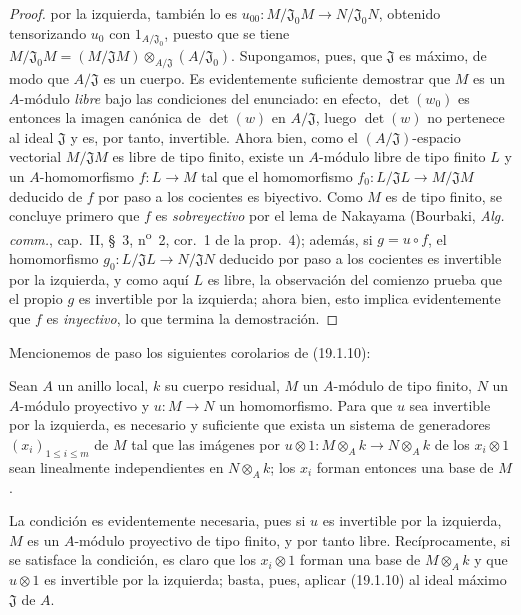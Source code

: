 \begin{proof}
por la izquierda, también lo es
$u_{00}:M/\mathfrak J_0M\to N/\mathfrak J_0N$, obtenido tensorizando $u_0$ con
$1_{A/\mathfrak J_0}$, puesto que se tiene
$M/\mathfrak J_0M=(M/\mathfrak JM)\otimes_{A/\mathfrak J}(A/\mathfrak J_0)$.
Supongamos, pues, que $\mathfrak J$ es máximo, de modo que $A/\mathfrak J$ es
un cuerpo. Es evidentemente suficiente demostrar que $M$ es un $A$-módulo
\emph{libre} bajo las condiciones del enunciado: en efecto, $\det(w_0)$ es
entonces la imagen canónica de $\det(w)$ en $A/\mathfrak J$, luego $\det(w)$
no pertenece al ideal $\mathfrak J$ y es, por tanto, invertible. Ahora bien,
como el $(A/\mathfrak J)$-espacio vectorial $M/\mathfrak JM$ es libre de tipo
finito, existe un $A$-módulo libre de tipo finito $L$ y un $A$-homomorfismo $f:L\to M$
tal que el homomorfismo $f_0:L/\mathfrak JL\to M/\mathfrak JM$ deducido de $f$
por paso a los cocientes es biyectivo. Como $M$ es de tipo finito, se concluye
primero que $f$ es \emph{sobreyectivo} por el lema de Nakayama (Bourbaki,
\emph{Alg. comm.}, cap.~II, §~3, n\textsuperscript{o}~2, cor.~1 de la
prop.~4); además, si $g=u\circ f$, el homomorfismo
$g_0:L/\mathfrak JL\to N/\mathfrak JN$ deducido por paso a los cocientes es
invertible por la izquierda, y como aquí $L$ es libre, la observación del
comienzo prueba que el propio $g$ es invertible por la izquierda; ahora bien,
esto implica evidentemente que $f$ es \emph{inyectivo}, lo que termina la demostración.
\end{proof}

Mencionemos de paso los siguientes corolarios de (19.1.10):

\begin{corollary}[19.1.11]
\label{0.19.1.11-fr}
Sean $A$ un anillo local, $k$ su cuerpo residual, $M$ un $A$-módulo de tipo
finito, $N$ un $A$-módulo proyectivo y $u:M\to N$ un homomorfismo. Para que
$u$ sea invertible por la izquierda, es necesario y suficiente que exista un
sistema de generadores $(x_i)_{1\leq i\leq m}$ de $M$ tal que las imágenes por
$u\otimes 1:M\otimes_Ak\to N\otimes_Ak$ de los $x_i\otimes1$ sean linealmente
independientes en $N\otimes_Ak$; los $x_i$ forman entonces una base de $M$.
\end{corollary}

La condición es evidentemente necesaria, pues si $u$ es invertible por la
izquierda, $M$ es un $A$-módulo proyectivo de tipo finito, y por tanto libre.
Recíprocamente, si se satisface la condición, es claro que los $x_i\otimes1$
forman una base de $M\otimes_Ak$ y que $u\otimes1$ es invertible por la
izquierda; basta, pues, aplicar (19.1.10) al ideal máximo $\mathfrak J$ de $A$.

